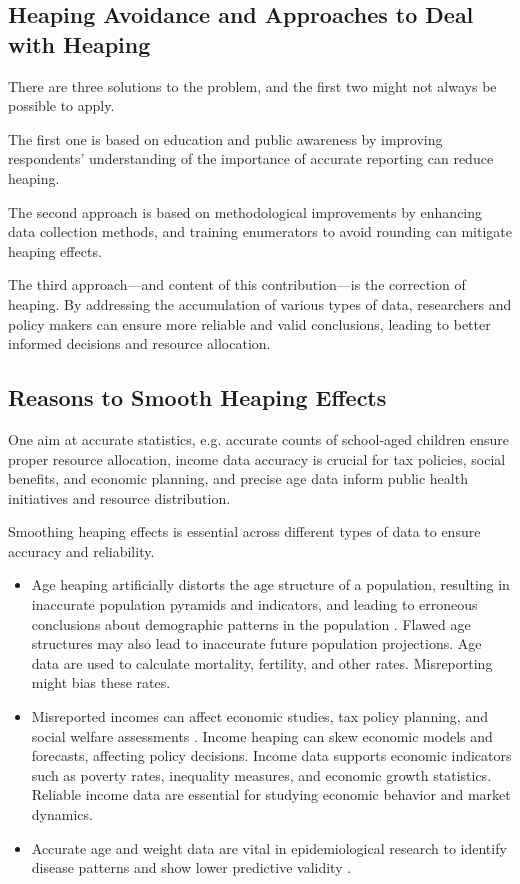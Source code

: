 \documentclass[12pt]{article}
\theoremstyle{plain}
\theoremstyle{definition}
\begin{document}
\subsection{Heaping Avoidance and Approaches to Deal with Heaping}

There are three solutions to the problem, and the first two might not always be possible to apply.

The first one is based on education and public awareness by improving respondents' understanding of the importance of accurate reporting can reduce heaping.

The second approach is based on methodological improvements by enhancing data collection methods, and training enumerators to avoid rounding can mitigate heaping effects.

The third approach---and content of this contribution---is the correction of heaping. By addressing the accumulation of various types of data, researchers and policy makers can ensure more reliable and valid conclusions, leading to better informed decisions and resource allocation.



\subsection{Reasons to Smooth Heaping Effects}

One aim at accurate statistics, e.g. accurate counts of school-aged children ensure proper resource allocation, income data accuracy is crucial for tax policies, social benefits, and economic planning, and precise age data inform public health initiatives and resource distribution.

Smoothing heaping effects is essential across different types of data to ensure accuracy and reliability.


\begin{itemize}
    \item
    Age heaping artificially distorts the age structure of a population, resulting in inaccurate population pyramids and indicators, and leading to erroneous conclusions about demographic patterns in the population \citep{un13}.
    Flawed age structures may also lead to inaccurate future population projections. Age data are used to calculate mortality, fertility, and other rates. Misreporting might bias these rates.
    \item Misreported incomes can affect economic studies, tax policy planning, and social welfare assessments \citep{seiver78}. Income heaping can skew economic models and forecasts, affecting policy decisions. Income data supports economic indicators such as poverty rates, inequality measures, and economic growth statistics. Reliable income data are essential for studying economic behavior and market dynamics.
    \item Accurate age and weight data are vital in epidemiological research to identify disease patterns and show lower predictive validity \citep{stavrakantonaki17}.
\end{itemize}
\end{document}
